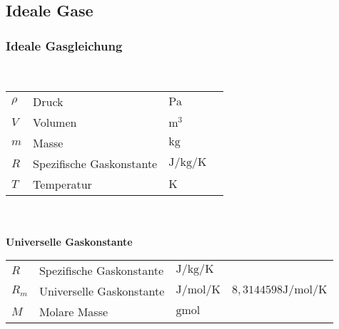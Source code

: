 \documentclass[a4paper, 10pt]{article}
\begin{document}
\subsection{Ideale Gase}

\subsubsection{Ideale Gasgleichung}
\begin{minipage}{0.45\textwidth}

 \\
\end{minipage}
\begin{minipage}{0.45\textwidth}

\begin{tabular}{llll}
$\rho$ & Druck & $\si{\pascal}$ & \\
$V$ & Volumen & $\si{\cubic\meter}$ & \\
$m$ & Masse & $\si{\kilogram}$ &  \\
$R$ & Spezifische Gaskonstante & $\si{\joule\per\kilogram\per\kelvin} $ & $ $ \\
$T$ & Temperatur & $\si{\kelvin}$ & \\
\end{tabular}

\end{minipage} 
\\\\
\textbf{Universelle Gaskonstante}\\
\begin{minipage}{0.45\textwidth}

\end{minipage}
\begin{minipage}{0.45\textwidth}

\begin{tabular}{llll}
$R$ & Spezifische Gaskonstante & $\si{\joule\per\kilogram\per\kelvin} $ & $ $ \\
$R_{m}$ & Universelle Gaskonstante & $\si{\joule\per\mol\per\kelvin} $ & $8,3144598 \si{\joule\per\mol\per\kelvin}$ \\
$M$ & Molare Masse & $\si{\gram\mol}$ & \\
\end{tabular}

\end{minipage}
\end{document}
